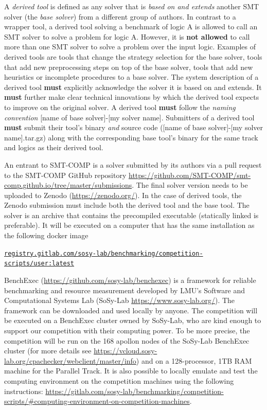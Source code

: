 \documentclass[12pt]{article}
\begin{document}
%
A \emph{derived tool} is defined as any solver that is \emph{based on and
extends} another SMT solver (the \emph{base solver}) from a different
group of authors.
In contrast to a wrapper tool, a derived tool solving a benchmark of logic A is allowed to call an SMT solver
to solve a problem for logic A.
However, it is \textbf{not allowed} to call more than one SMT solver to solve a problem over the input logic.
Examples of derived tools are tools that change the strategy selection for the base solver,
tools that add new preprocessing steps on top of the base solver,
tools that add new heuristics or incomplete procedures to a base solver.
The system description of a derived tool
\textbf{must} explicitly acknowledge
the solver it is based on and extends.  It \textbf{must} further make clear
technical innovations by which the derived tool expects to improve on the
original solver.  A derived tool \textbf{must} follow the \emph{naming convention}
{[name of base solver]-[my solver name]}.
Submitters of a derived tool \textbf{must} submit their tool's binary \emph{and} source code
({[name of base solver]-[my solver name]}.tar.gz) along with the corresponding base
tool's binary for the same track and logics as their derived tool.

%
An entrant to SMT-COMP is a solver submitted by its authors via
a pull request to the SMT-COMP GitHub repository
\url{https://github.com/SMT-COMP/smt-comp.github.io/tree/master/submissions}.
The final solver version needs to be uploaded to Zenodo (\url{https://zenodo.org/}).
In the case of derived tools, the Zenodo submission must include both the derived tool and the base tool.
The solver is an archive that contains the precompiled executable (statically linked is preferable).
It will be executed on a computer that has the same installation as the following docker image
\begin{center}
  \footnotesize
\texttt{\url{registry.gitlab.com/sosy-lab/benchmarking/competition-scripts/user:latest}}
\end{center}


%
BenchExec (\url{https://github.com/sosy-lab/benchexec}) is a framework for reliable benchmarking and resource
measurement developed by LMU's Software and Computational Systems Lab (SoSy-Lab \url{https://www.sosy-lab.org/}).
The framework can be downloaded and used locally by anyone.
The competition will be executed on a BenchExec cluster owned by SoSy-Lab,
who are kind enough to support our competition with their computing power.
To be more precise, the competition will be run on the 168 apollon nodes of the
SoSy-Lab BenchExec cluster (for more details see \url{https://vcloud.sosy-lab.org/cpachecker/webclient/master/info}) and on a 128-processor, 1TB RAM machine for the Parallel Track.
It is also possible to locally emulate and test the computing environment on
the competition machines using the following instructions:
\url{https://gitlab.com/sosy-lab/benchmarking/competition-scripts/#computing-environment-on-competition-machines}.
\end{document}
